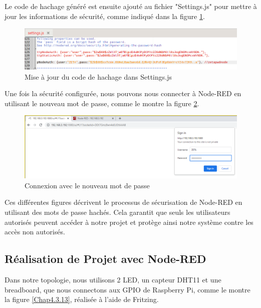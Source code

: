 Le code de hachage généré est ensuite ajouté au fichier "Settings.js" pour mettre à jour les informations de sécurité, comme indiqué dans la figure \ref{Chap4.3.11}.

\begin{figure}[H]
\centering
\includegraphics[width=15cm]{Images/Node-4.png}
\caption{Mise à jour du code de hachage dans Settings.js}
\label{Chap4.3.11}
\end{figure}

Une fois la sécurité configurée, nous pouvons nous connecter à Node-RED en utilisant le nouveau mot de passe, comme le montre la figure \ref{Chap4.3.12}.

\begin{figure}[H]
\centering
\includegraphics[width=15cm]{Images/Node-5.png}
\caption{Connexion avec le nouveau mot de passe}
\label{Chap4.3.12}
\end{figure}

Ces différentes figures décrivent le processus de sécurisation de Node-RED en utilisant des mots de passe hachés. Cela garantit que seuls les utilisateurs autorisés peuvent accéder à notre projet et protège ainsi notre système contre les accès non autorisés.

\subsection{Réalisation de Projet avec Node-RED}

Dans notre topologie, nous utilisons 2 LED, un capteur DHT11 et une breadboard, que nous connectons aux GPIO de Raspberry Pi, comme le montre la figure \ref{Chap4.3.13}, réalisée à l'aide de Fritzing.

